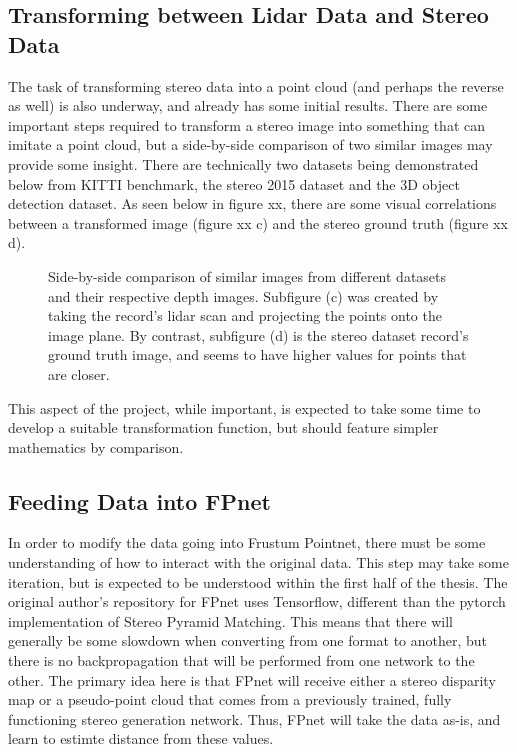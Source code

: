 \subsection{Transforming between Lidar Data and Stereo Data}
The task of transforming stereo data into a point cloud (and perhaps the reverse as well) is also underway, and already has some initial results. There are some important steps required to transform a stereo image into something that can imitate a point cloud, but a side-by-side comparison of two similar images may provide some insight. There are technically two datasets being demonstrated below from KITTI benchmark, the stereo 2015 dataset and the 3D object detection dataset. As seen below in figure xx, there are some visual correlations between a transformed image (figure xx c) and the stereo ground truth (figure xx d).


\begin{figure}[h]
    \centering  
    \caption{Side-by-side comparison of similar images from different datasets and their respective depth images. Subfigure (c) was created by taking the record's lidar scan and projecting the points onto the image plane. By contrast, subfigure (d) is the stereo dataset record's ground truth image, and seems to have higher values for points that are closer. }
\end{figure}

This aspect of the project, while important, is expected to take some time to develop a suitable transformation function, but should feature simpler mathematics by comparison.

\subsection{Feeding Data into FPnet}
In order to modify the data going into Frustum Pointnet, there must be some understanding of how to interact with the original data. This step may take some iteration, but is expected to be understood within the first half of the thesis. The original author's repository for FPnet uses Tensorflow, different than the pytorch implementation of Stereo Pyramid Matching. This means that there will generally be some slowdown when converting from one format to another, but there is no backpropagation that will be performed from one network to the other. The primary idea here is that FPnet will receive either a stereo disparity map or a pseudo-point cloud that comes from a previously trained, fully functioning stereo generation network. Thus, FPnet will take the data as-is, and learn to estimte distance from these values.

